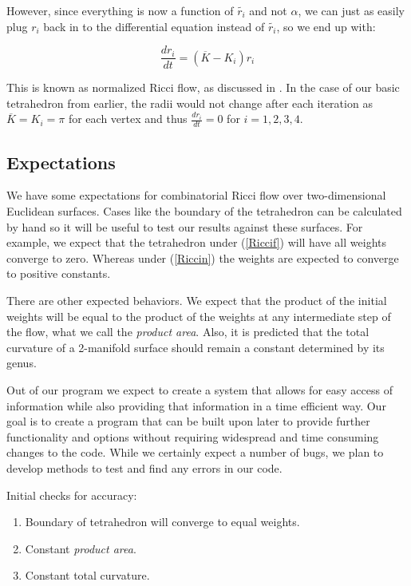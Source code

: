 \documentclass[12pt]{article}
\begin{document}
\noindent However, since everything is now a function of $\tilde{r_i}$ and not $\alpha$, we can just as easily plug $r_i$ back in to the differential equation instead of $\tilde{r_i}$, so we end up with:

\begin{equation}
\label{Riccin}
\frac{dr_i}{dt} = (\overline{K} - K_i)r_i
\end{equation}

\noindent This is known as normalized Ricci flow, as discussed in \cite{chowluo}. In the case of our basic tetrahedron from earlier, the radii would not change after each iteration as $\overline{K} = K_i = \pi$ for each vertex and thus $\displaystyle\frac{dr_i}{dt} = 0$ for $i = 1,2,3,4$. 

\subsection{Expectations}

We have some expectations for combinatorial Ricci flow over two-dimensional Euclidean surfaces. Cases like the boundary of the tetrahedron can be calculated by hand so it will be useful to test our results against these surfaces. For example, we expect that the tetrahedron under (\ref{Riccif}) will have all weights converge to zero. Whereas under (\ref{Riccin}) the weights are expected to converge to positive constants.\newline

\noindent There are other expected behaviors. We expect that the product of the initial weights will be equal to the product of the weights at any intermediate step of the flow, what we call the \textit{product area}. Also, it is predicted that the total curvature of a 2-manifold surface should remain a constant determined by its genus.\newline

\noindent Out of our program we expect to create a system that allows for easy access of information while also providing that information in a time efficient way. Our goal is to create a program that can be built upon later to provide further functionality and options without requiring widespread and time consuming changes to the code. While we certainly expect a number of bugs, we plan to develop methods to test and find any errors in our code. \newline


\noindent Initial checks for accuracy:
\begin{enumerate}
\item Boundary of tetrahedron will converge to equal weights.
\item Constant \textit{product area}.
\item Constant total curvature.
\end{enumerate}
\end{document}

